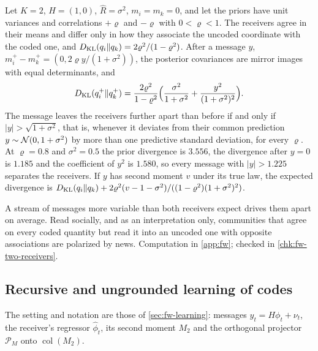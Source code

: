 \begin{example}\label{ex:fw-disagreement}
Let $K=2$, $\hat H=(1,0)$, $\hat R=\sigma^2$, $m_i=m_k=0$, and let the priors have unit variances and correlations $+\varrho$ and $-\varrho$ with $0<\varrho<1$. The receivers agree in their means and differ only in how they associate the uncoded coordinate with the coded one, and $D_{\mathrm{KL}}(q_i\Vert q_k)=2\varrho^2/(1-\varrho^2)$. After a message $y$, $m_i^+-m_k^+=(0,2\varrho y/(1+\sigma^2))$, the posterior covariances are mirror images with equal determinants, and
\begin{equation}\label{eq:fw-disagreement}
D_{\mathrm{KL}}(q_i^+\Vert q_k^+)=\frac{2\varrho^2}{1-\varrho^2}\Bigl(\frac{\sigma^2}{1+\sigma^2}+\frac{y^2}{(1+\sigma^2)^2}\Bigr).
\end{equation}
The message leaves the receivers further apart than before if and only if $\lvert y\rvert>\sqrt{1+\sigma^2}$, that is, whenever it deviates from their common prediction $y\sim\mathcal{N}(0,1+\sigma^2)$ by more than one predictive standard deviation, for every $\varrho$. At $\varrho=0.8$ and $\sigma^2=0.5$ the prior divergence is $3.556$, the divergence after $y=0$ is $1.185$ and the coefficient of $y^2$ is $1.580$, so every message with $\lvert y\rvert>1.225$ separates the receivers. If $y$ has second moment $v$ under its true law, the expected divergence is $D_{\mathrm{KL}}(q_i\Vert q_k)+2\varrho^2(v-1-\sigma^2)/((1-\varrho^2)(1+\sigma^2)^2)$.
\end{example}

A stream of messages more variable than both receivers expect drives them apart on average. Read socially, and as an interpretation only, communities that agree on every coded quantity but read it into an uncoded one with opposite associations are polarized by news. Computation in \cref{app:fw}; checked in \cref{chk:fw-two-receivers}.

\subsection{Recursive and ungrounded learning of codes}\label{sup:fw-recursive-and-ungrounded-learning-of-cod}

The setting and notation are those of \cref{sec:fw-learning}: messages $y_t=H\phi_t+\nu_t$, the receiver's regressor $\hat\phi_t$, its second moment $M_2$ and the orthogonal projector $\mathcal P_M$ onto $\operatorname{col}(M_2)$.

